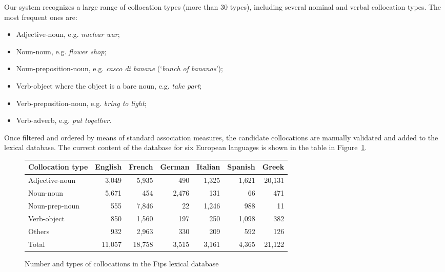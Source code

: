 \documentclass[output=paper]{langsci/langscibook}
\begin{document}
 
Our system recognizes a large range of collocation types (more than 30 types), including several nominal and verbal collocation types. The most frequent ones are:\\
\begin{itemize}
\item 	Adjective-noun, e.g. \textit{nuclear war};
\item	Noun-noun, e.g. \textit{flower shop};
\item	Noun-preposition-noun, e.g. \textit{casco di banane} (`\textit{bunch of bananas}');
\item	Verb-object where the object is a bare noun, e.g. \textit{take part};
\item	Verb-preposition-noun, e.g. \textit{bring to light};
\item	Verb-adverb, e.g. \textit{put together}.
\end{itemize}
\vspace{3mm}

		Once filtered and ordered by means of standard association measures, the candidate collocations are manually validated and added to the lexical database. The current content of the database for six European languages is shown in the table in Figure~\ref{fig6}.

\begin{figure}[htbp]
\begin{tabular}{lrrrrrr}
Collocation type & English	& French &	German	& Italian	& Spanish	& Greek\\ \hline
Adjective-noun	& 3,049	& 5,935 & 	490 &	1,325	& 1,621 & 20,131	\\
Noun-noun	& 5,671 & 	454 & 	2,476  &	131 &	66	& 471\\
Noun-prep-noun & 555 & 7,846 & 22 & 1,246 & 988 & 11 \\
Verb-object	 & 850 &	1,560 &	197 &	250 &	1,098	& 382\\
Others	& 932 &	2,963 &	330 &	209	 & 592 & 126\\	\hline
Total	& 11,057	& 18,758 &	3,515 &	3,161 &	4,365	& 21,122
\end{tabular}
\caption{\label{fig6}Number and types of collocations in the Fips lexical database}
\end{figure}
\end{document}

